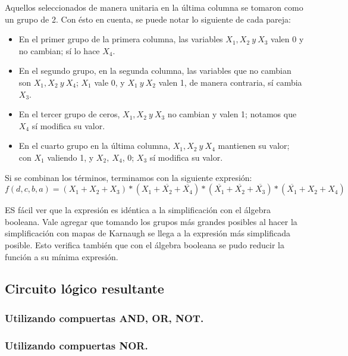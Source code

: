 Aquellos seleccionados de manera unitaria en la última columna se tomaron como un grupo de 2.
Con ésto en cuenta, se puede notar lo siguiente de cada pareja:
\begin{itemize}
    \item En el primer grupo de la primera columna, las variables \(X_1, X_2~y~X_3\) valen 0 y no cambian; sí lo hace \(X_4\).
    \item En el segundo grupo, en la segunda columna, las variables que no cambian son \(X_1, X_2~y~X_4\); \(X_1\) vale 0, y \(X_1~y~X_2 \) valen 1, de manera contraria, sí cambia \(X_3\).
    \item En el tercer grupo de ceros, $X_1, X_2~y~X_3$ no cambian y valen 1; notamos que \(X_4\) sí modifica su valor.
    \item En el cuarto grupo en la última columna, $X_1, X_2~y~X_4$ mantienen su valor; con \(X_1\) valiendo 1, y \(X_2,~X_4\), 0; \(X_3\) sí modifica su valor.
\end{itemize}
\vspace{5mm}


\vspace{5mm}
Si se combinan los términos, terminamos con la siguiente expresión:
\vspace{5mm}
\begin{dmath}
    f(d,c,b,a)={(X_{1}+X_{2}+X_{3})}*{(X_1+\overline{X_2}+\overline{X_4})}*{(\overline{X_1}+\overline{X_2}+\overline{X_3})}*{(\overline{X_1}+X_2+X_4)}
\end{dmath}
\vspace{5mm}

ES fácil ver que la expresión es idéntica a la simplificación con el álgebra booleana. Vale agregar que tomando los grupos más grandes posibles al hacer la simplificación con mapas de Karnaugh se llega a la expresión más simplificada posible. Esto verifica también que con el álgebra booleana se pudo reducir la función a su mínima expresión.


\subsection{Circuito lógico resultante}
\subsubsection{Utilizando compuertas AND, OR, NOT.}

\subsubsection{Utilizando compuertas NOR.}

